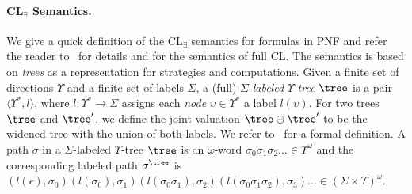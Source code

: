 \documentclass{LMCS}
\theoremstyle{plain}\newtheorem{theorem}[thm]{Theorem}
\theoremstyle{plain}\newtheorem{lemma}[thm]{Lemma}
\theoremstyle{plain}\newtheorem{proposition}[thm]{Proposition}
\theoremstyle{plain}\newtheorem{corollary}[thm]{Corollary}
\theoremstyle{definition}\newtheorem{definition}{Definition}[section]
\begin{document}
\paragraph{\bf CL$\bm{_\exists}$ Semantics.} \label{sec:cl_semantics}
We give a quick definition of the CL$_\exists$ semantics for formulas in PNF and refer the reader to~\cite{DBLP:conf/csl/FinkbeinerS10} for details and for the semantics of full CL\@.
The semantics is based on 
\emph{trees} as a representation for strategies and computations.
Given a finite set of directions $\Upsilon$ and a finite set of labels $\Sigma$, a (full) $\Sigma$-\textit{labeled} $\Upsilon$-\textit{tree} $\tree$ is a pair $\langle \Upsilon^*, l \rangle$, where $l : \Upsilon^* \rightarrow \Sigma$ assigns each \textit{node} $\upsilon \in \Upsilon^*$ a label $l(\upsilon)$.
For two trees $\tree$ and $\tree'$, we define the joint valuation $\tree \oplus \tree'$ to be the widened tree with the union of both labels.
We refer to~\cite{DBLP:conf/csl/FinkbeinerS10} for a formal definition.
A path $\sigma$ in a $\Sigma$-labeled $\Upsilon$-tree $\tree$ is an $\omega$-word $\sigma_0 \sigma_1 \sigma_2 \ldots \in \Upsilon^\omega$ and the corresponding labeled path $\sigma^\tree$ is $(l(\epsilon), \sigma_0) (l(\sigma_0), \sigma_1) (l(\sigma_0 \sigma_1), \sigma_2) (l(\sigma_0 \sigma_1 \sigma_2), \sigma_3) \ldots \in (\Sigma \times \Upsilon)^\omega$.
\end{document}
